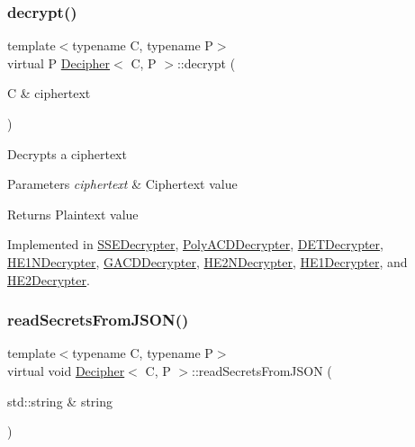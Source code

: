 \subsubsection{\texorpdfstring{decrypt()}{decrypt()}}
{\footnotesize\ttfamily template$<$typename C, typename P$>$ \\
virtual P \hyperlink{classDecipher}{Decipher}$<$ C, P $>$\+::decrypt (\begin{DoxyParamCaption}\item[{C \&}]{ciphertext }\end{DoxyParamCaption})\hspace{0.3cm}{\ttfamily [pure virtual]}}

Decrypts a ciphertext 
\begin{DoxyParams}{Parameters}
{\em ciphertext} & Ciphertext value \\
\hline
\end{DoxyParams}
\begin{DoxyReturn}{Returns}
Plaintext value 
\end{DoxyReturn}


Implemented in \hyperlink{classSSEDecrypter_afc1522b78aed502f8ca94163fc030ffa}{S\+S\+E\+Decrypter}, \hyperlink{classPolyACDDecrypter_a96626f2c267d9cc4b18ed25cb584d982}{Poly\+A\+C\+D\+Decrypter}, \hyperlink{classDETDecrypter_ac317ce154d64eb1fce4450c2b03a12d9}{D\+E\+T\+Decrypter}, \hyperlink{classHE1NDecrypter_a8e49ff8292a76884f328c566f4d1b646}{H\+E1\+N\+Decrypter}, \hyperlink{classGACDDecrypter_a92f6afd3d0a43dd5538cf6a83398ee33}{G\+A\+C\+D\+Decrypter}, \hyperlink{classHE2NDecrypter_aa92e4ddf62a0f2c4199722983e28b0c9}{H\+E2\+N\+Decrypter}, \hyperlink{classHE1Decrypter_a28cc03e8a37f321b8f805cc04b2e69e0}{H\+E1\+Decrypter}, and \hyperlink{classHE2Decrypter_a766f96cb2277fd3e4af59ca44a32d519}{H\+E2\+Decrypter}.

\mbox{\label{classDecipher_a39aea002012130201e12a8fa7d84dda5}} 
\subsubsection{\texorpdfstring{read\+Secrets\+From\+J\+S\+O\+N()}{readSecretsFromJSON()}}
{\footnotesize\ttfamily template$<$typename C, typename P$>$ \\
virtual void \hyperlink{classDecipher}{Decipher}$<$ C, P $>$\+::read\+Secrets\+From\+J\+S\+ON (\begin{DoxyParamCaption}\item[{std\+::string \&}]{string }\end{DoxyParamCaption})\hspace{0.3cm}{\ttfamily [pure virtual]}}

